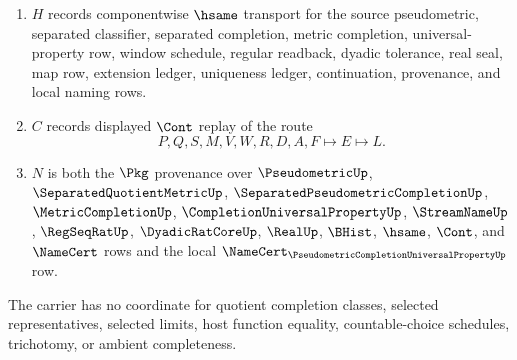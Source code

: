 \begin{definition}
\begin{enumerate}
\item $H$ records componentwise $\hsame$ transport for the source pseudometric, separated classifier, separated completion, metric completion, universal-property row, window schedule, regular readback, dyadic tolerance, real seal, map row, extension ledger, uniqueness ledger, continuation, provenance, and local naming rows.
\item $C$ records displayed $\Cont$ replay of the route
$$
P,Q,S,M,V,W,R,D,A,F\longmapsto E\longmapsto L .
$$
\item $N$ is both the $\Pkg$ provenance over $\PseudometricUp$, $\SeparatedQuotientMetricUp$, $\SeparatedPseudometricCompletionUp$, $\MetricCompletionUp$, $\CompletionUniversalPropertyUp$, $\StreamNameUp$, $\RegSeqRatUp$, $\DyadicRatCoreUp$, $\RealUp$, $\BHist$, $\hsame$, $\Cont$, and $\NameCert$ rows and the local $\NameCert_{\PseudometricCompletionUniversalPropertyUp}$ row.
\end{enumerate}
The carrier has no coordinate for quotient completion classes, selected representatives, selected limits, host function equality, countable-choice schedules, trichotomy, or ambient completeness.
\end{definition}

